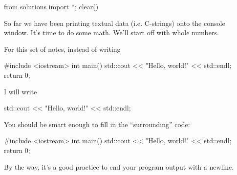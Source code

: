 \begin{python0}
from solutions import *; clear()
\end{python0}

So far we have been printing textual data (i.e. C-strings) onto the console
window. It's time to do some math. We'll start off with whole numbers.


For this set of notes, instead of writing

\begin{console}
#include <iostream>
int main()
{
    std::cout << "Hello, world!" << std::endl;
    return 0;
}
\end{console}

I will write
\begin{console}
std::cout << "Hello, world!" << std::endl;
\end{console}

You should be smart enough to fill in the “surrounding” code:
\begin{console}
#include <iostream>
int main()
{
    std::cout << "Hello, world!" << std::endl;
    return 0;
}
\end{console}

By the way, it's a good practice to end your program output with a
newline.

